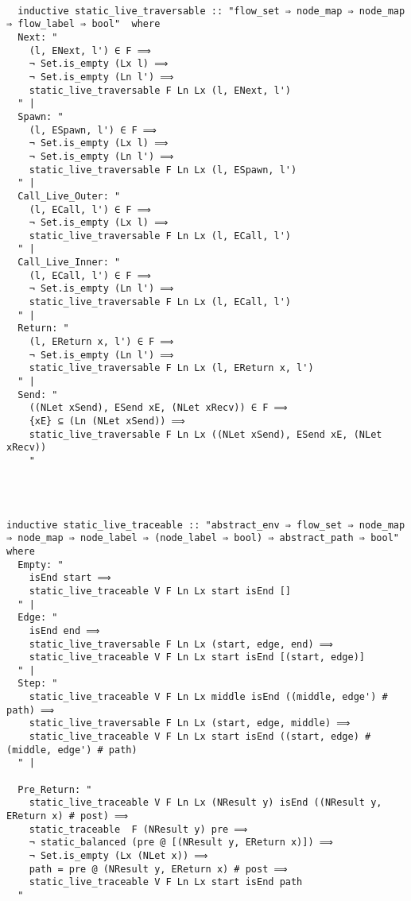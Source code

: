 \documentclass{article}
\begin{document}
\begin{lstlisting}[style=codestyle1, escapechar=\%]

  inductive static_live_traversable :: "flow_set ⇒ node_map ⇒ node_map ⇒ flow_label ⇒ bool"  where
  Next: "
    (l, ENext, l') ∈ F ⟹
    ¬ Set.is_empty (Lx l) ⟹
    ¬ Set.is_empty (Ln l') ⟹
    static_live_traversable F Ln Lx (l, ENext, l')
  " |
  Spawn: "
    (l, ESpawn, l') ∈ F ⟹
    ¬ Set.is_empty (Lx l) ⟹
    ¬ Set.is_empty (Ln l') ⟹
    static_live_traversable F Ln Lx (l, ESpawn, l')
  " |
  Call_Live_Outer: "
    (l, ECall, l') ∈ F ⟹
    ¬ Set.is_empty (Lx l) ⟹
    static_live_traversable F Ln Lx (l, ECall, l')
  " |
  Call_Live_Inner: "
    (l, ECall, l') ∈ F ⟹
    ¬ Set.is_empty (Ln l') ⟹
    static_live_traversable F Ln Lx (l, ECall, l')
  " |
  Return: "
    (l, EReturn x, l') ∈ F ⟹
    ¬ Set.is_empty (Ln l') ⟹
    static_live_traversable F Ln Lx (l, EReturn x, l')
  " |
  Send: "
    ((NLet xSend), ESend xE, (NLet xRecv)) ∈ F ⟹
    {xE} ⊆ (Ln (NLet xSend)) ⟹
    static_live_traversable F Ln Lx ((NLet xSend), ESend xE, (NLet xRecv))
    "
    
  \end{lstlisting}


\begin{lstlisting}[style=codestyle1, escapechar=\%]

  
inductive static_live_traceable :: "abstract_env ⇒ flow_set ⇒ node_map ⇒ node_map ⇒ node_label ⇒ (node_label ⇒ bool) ⇒ abstract_path ⇒ bool" where
  Empty: "
    isEnd start ⟹
    static_live_traceable V F Ln Lx start isEnd []
  " |
  Edge: "
    isEnd end ⟹
    static_live_traversable F Ln Lx (start, edge, end) ⟹
    static_live_traceable V F Ln Lx start isEnd [(start, edge)]
  " |
  Step: "
    static_live_traceable V F Ln Lx middle isEnd ((middle, edge') # path) ⟹
    static_live_traversable F Ln Lx (start, edge, middle) ⟹
    static_live_traceable V F Ln Lx start isEnd ((start, edge) # (middle, edge') # path)
  " |

  Pre_Return: "
    static_live_traceable V F Ln Lx (NResult y) isEnd ((NResult y, EReturn x) # post) ⟹
    static_traceable  F (NResult y) pre ⟹
    ¬ static_balanced (pre @ [(NResult y, EReturn x)]) ⟹
    ¬ Set.is_empty (Lx (NLet x)) ⟹
    path = pre @ (NResult y, EReturn x) # post ⟹
    static_live_traceable V F Ln Lx start isEnd path
  "

    
  \end{lstlisting}
\end{document}
